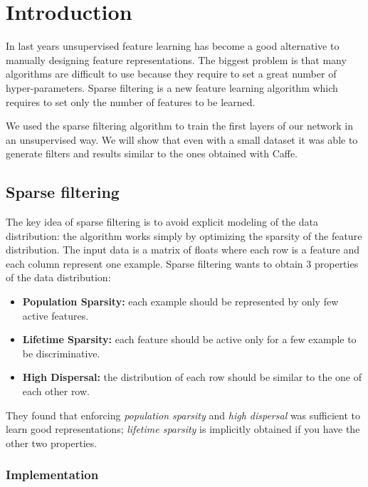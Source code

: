 \section{Introduction}

In last years unsupervised feature learning has become a good alternative to manually designing feature representations. The biggest problem is that many algorithms are difficult to use because they require to set a great number of hyper-parameters. Sparse filtering is a new feature learning algorithm which requires to set only the number of features to be learned.

We used the sparse filtering algorithm to train the first layers of our network in an unsupervised way. We will show that even with a small dataset it was able to generate filters and results similar to the ones obtained with Caffe.

\subsection{Sparse filtering}

The key idea of sparse filtering is to avoid explicit modeling of the data distribution: the algorithm works simply by optimizing the sparsity of the feature distribution. The input data is a matrix of floats where each row is a feature and each column represent one example. Sparse filtering wants to obtain 3 properties of the data distribution:
\begin{itemize}
\item \textbf{Population Sparsity:} each example should be represented by only few active features.
\item \textbf{Lifetime Sparsity:} each feature should be active only for a few example to be discriminative.
\item \textbf{High Dispersal:} the distribution of each row should be similar to the one of each other row.
\end{itemize}
They found that enforcing \textit{population sparsity} and \textit{high dispersal} was sufficient to learn good representations; \textit{lifetime sparsity} is implicitly obtained if you have the other two properties.

\subsubsection{Implementation}

